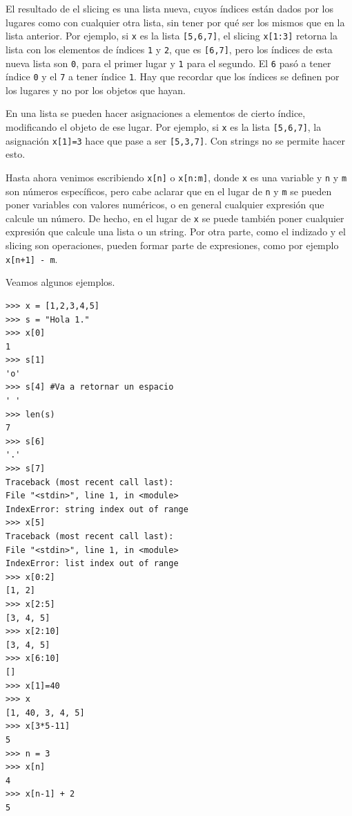 \documentclass[a4paper, 12pt]{report}
\theoremstyle{definition}
\begin{document}
El resultado de el slicing es una lista nueva, cuyos índices están dados por los lugares como con cualquier otra lista, sin tener por qué ser los mismos que en la lista anterior. Por ejemplo, si {\tt x} es la lista {\tt [5,6,7]}, el slicing {\tt x[1:3]} retorna la lista con los elementos de índices {\tt 1} y {\tt 2}, que es {\tt [6,7]}, pero los índices de esta nueva lista son {\tt 0}, para el primer lugar y {\tt 1} para el segundo. El {\tt 6} pasó a tener índice {\tt 0} y el {\tt 7} a tener índice {\tt 1}. Hay que recordar que los índices se definen por los lugares y no por los objetos que hayan. 

En una lista se pueden hacer asignaciones a elementos de cierto índice, modificando el objeto de ese lugar. Por ejemplo, si {\tt x} es la lista {\tt [5,6,7]}, la asignación {\tt x[1]=3} hace que pase a ser {\tt [5,3,7]}. Con strings no se permite hacer esto.

Hasta ahora venimos escribiendo {\tt x[n]} o {\tt x[n:m]}, donde {\tt x} es una variable y {\tt n} y {\tt m} son números específicos, pero cabe aclarar que en el lugar de {\tt n} y {\tt m} se pueden poner variables con valores numéricos, o en general cualquier expresión que calcule un número. De hecho, en el lugar de {\tt x} se puede también poner cualquier expresión que calcule una lista o un string. Por otra parte, como el indizado y el slicing son operaciones, pueden formar parte de expresiones, como por ejemplo {\tt x[n+1] - m}.

Veamos algunos ejemplos.
\begin{verbatim}
>>> x = [1,2,3,4,5]
>>> s = "Hola 1."
>>> x[0]
1
>>> s[1]
'o'
>>> s[4] #Va a retornar un espacio
' '
>>> len(s)
7
>>> s[6]
'.'
>>> s[7]
Traceback (most recent call last):
File "<stdin>", line 1, in <module>
IndexError: string index out of range
>>> x[5]
Traceback (most recent call last):
File "<stdin>", line 1, in <module>
IndexError: list index out of range
>>> x[0:2]
[1, 2]
>>> x[2:5]
[3, 4, 5]
>>> x[2:10]
[3, 4, 5]
>>> x[6:10]
[]
>>> x[1]=40
>>> x
[1, 40, 3, 4, 5]
>>> x[3*5-11]
5
>>> n = 3
>>> x[n]
4
>>> x[n-1] + 2
5
\end{verbatim}
\end{document}
